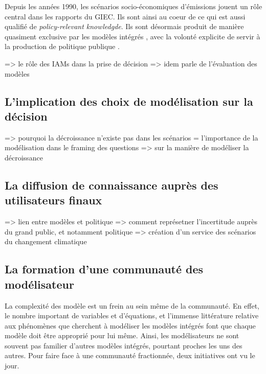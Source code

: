 Depuis les années 1990, les scénarios socio-économiques d'émissions jouent un rôle central dans les rapports du GIEC. Ils sont ainsi au coeur de ce qui est aussi qualifié de \emph{policy-relevant knowledgde}. Ils sont désormais produit de manière quasiment exclusive par les modèles intégrés \cite{cointe_organising_2019}, avec la volonté explicite de servir à la production de politique publique \cite{Weyant}. 



\cite{cointe_organising_2019} => le rôle des IAMs dans la prise de décision
\cite{edwards_global_1996} => idem
\cite{wynne_institutional_1984} parle de l'évaluation des modèles 

\subsection{L'implication des choix de modélisation sur la décision}


\cite{cointe_understanding_2023} => pourquoi la décroissance n'existe pas dans les scénarios = l'importance de la modélisation dans le framing des questions
\cite{briens_decroissance_2015} => sur la manière de modéliser la décroissance

\subsection{La diffusion de connaissance auprès des utilisateurs finaux}

\cite{boulanger_models_2005} => lien entre modèles et politique
\cite{shackley_representing_1996} => comment représetner l'incertitude auprès du grand public, et notamment politique
\cite{auer_climate_2021} => création d'un service des scénarios du changement climatique

\subsection{La formation d'une communauté des modélisateur}

La complexité des modèle est un frein au sein même de la communauté. En effet, le nombre important de variables et d'équations, et l'immense littérature relative aux phénomènes que cherchent à modéliser les modèles intégrés font que chaque modèle doit être approprié pour lui même. Ainsi, les modélisateurs ne sont souvent pas familier d'autres modèles intégrés, pourtant proches les uns des autres. Pour faire face à une communauté fractionnée, deux initiatives ont vu le jour. 

